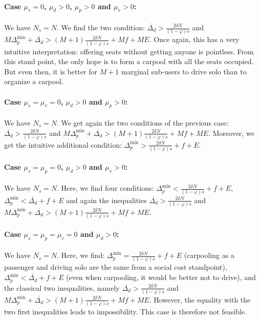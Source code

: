 \documentclass[english, a4paper]{article}
\theoremstyle{plain}
\theoremstyle{definition}
\theoremstyle{remark}
\begin{document}
\paragraph{Case $\mu_s = 0$, $\mu_d > 0$, $\mu_p > 0$ and $\mu_v >0$:} We have $N_s = N$. We find the two condition: $\overline{\Delta_d}>\frac{2\delta N}{(1 - \varphi ) s}$ and $M\Delta_p^{\text{min}} + \overline{\Delta_d} > (M+1)\frac{2\delta N}{(1 - \varphi ) s} + Mf + ME$. Once again, this has a very intuitive interpretation: offering seats without getting anyone is pointless. From this stand point, the only hope is to form a carpool with all the seats occupied. But even then, it is better for $M+1$ marginal sub-users to drive solo than to organize a carpool.

\paragraph{Case $\mu_s = \mu_v = 0$, $\mu_d > 0$ and $\mu_p > 0$:} We have $N_s = N$. We get again the two conditions of the previous case: $\overline{\Delta_d} > \frac{2\delta N}{(1 - \varphi ) s}$ and $M\Delta_p^{\text{min}} + \overline{\Delta_d} > (M+1)\frac{2\delta N}{(1 - \varphi ) s} + Mf + ME$. Moreover, we get the intuitive additional condition: $\Delta_p^{\text{min}} > \frac{2\delta N}{(1 - \varphi ) s} + f + E$.

\paragraph{Case $\mu_s = \mu_p = 0$, $\mu_d > 0$ and $\mu_v > 0$:} We have $N_s = N$. Here, we find four conditions: $\Delta_p^{\text{min}} < \frac{2\delta N}{(1 - \varphi ) s} + f + E$, $\Delta_p^{\text{min}} < \overline{\Delta_d} + f + E$ and again the inequalities $\overline{\Delta_d} > \frac{2\delta N}{(1 - \varphi ) s}$ and $M\Delta_p^{\text{min}} + \overline{\Delta_d} > (M+1)\frac{2\delta N}{(1 - \varphi ) s} + Mf + ME$.

\paragraph{Case $\mu_s = \mu_p = \mu_v = 0$ and $\mu_d > 0$:} We have $N_s = N$. Here, we find: $\Delta_p^{\text{min}} = \frac{2\delta N}{(1 - \varphi ) s} + f + E$ (carpooling as a passenger and driving solo are the same from a social cost standpoint), $\Delta_p^{\text{min}} < \overline{\Delta_d} + f + E$ (even when carpooling, it would be better not to drive), and the classical two inequalities, namely $\overline{\Delta_d} > \frac{2\delta N}{(1 - \varphi ) s}$ and $M\Delta_p^{\text{min}} + \overline{\Delta_d} > (M+1)\frac{2\delta N}{(1 - \varphi ) s} + Mf + ME$. However, the equality with the two first inequalities leads to impossibility. This case is therefore not feasible.
\end{document}
